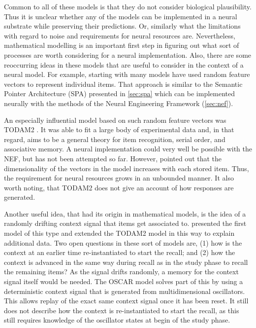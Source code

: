 Common to all of these models is that they do not consider biological plausibility.
Thus it is unclear whether any of the models can be implemented in a neural substrate while preserving their predictions.
Or, similarly what the limitations with regard to noise and requirements for neural resources are.
Nevertheless, mathematical modelling is an important first step in figuring out what sort of processes are worth considering for a neural implementation.
Also, there are some reoccurring ideas in these models that are useful to consider in the context of a neural model.
For example, starting with \textcite{Anderson1973} many models have used random feature vectors to represent individual items.
That approach is similar to the Semantic Pointer Architecture (SPA) presented in \cref{sec:spa} which can be implemented neurally with the methods of the Neural Engineering Framework (\cref{sec:nef}).

An especially influential model based on such random feature vectors was \mbox{TODAM2} \parencite{Murdock1993}.
It was able to fit a large body of experimental data and, in that regard, aims to be a general theory for item recognition, serial order, and associative memory.
A neural implementation could very well be possible with the NEF, but has not been attempted so far.
However, \textcite{Choo2010} pointed out that the dimensionality of the vectors in the model increases with each stored item.
Thus, the requirement for neural resources grows in an unbounded manner.
It also worth noting, that \mbox{TODAM2} does not give an account of how responses are generated.

Another useful idea, that had its origin in mathematical models, is the idea of a randomly drifting context signal that items get associated to.
\Textcite{Estes1955} presented the first model of this type and \textcite{Murdock1997} extended the \mbox{TODAM2} model in this way to explain additional data.
Two open questions in these sort of models are, (1) how is the context at an earlier time re-instantiated to start the recall;
and (2) how the context is advanced in the same way during recall as in the study phase to recall the remaining items?
As the signal drifts randomly, a memory for the context signal itself would be needed.
The OSCAR model \parencite{Brown2000} solves part of this by using a deterministic context signal that is generated from multidimensional oscillators.
This allows replay of the exact same context signal once it has been reset.
It still does not describe how the context is re-instantiated to start the recall, as this still requires knowledge of the oscillator states at begin of the study phase.


